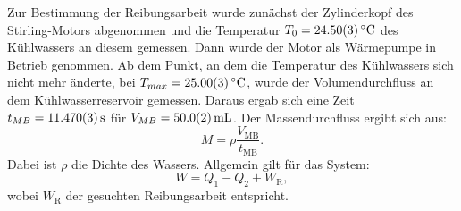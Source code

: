 	Zur Bestimmung der Reibungsarbeit wurde zunächst der Zylinderkopf des Stirling-Motors abgenommen und die Temperatur $T_0 = \SI{24,5+-0,03}{\celsius}$ des Kühlwassers an diesem gemessen.
	Dann  wurde der Motor als Wärmepumpe in Betrieb genommen.
	Ab dem Punkt, an dem die Temperatur des Kühlwassers sich nicht mehr änderte, bei $T_{max} = \SI{25,0+-0,03}{\celsius}$, wurde der Volumendurchfluss an dem Kühlwasserreservoir gemessen.
	Daraus ergab sich eine Zeit $t_{MB} = \SI{11,47+-0,003}{\second}$ für $V_{MB} = \SI{50+-0,2}{\milli\liter}$.
	Der Massendurchfluss ergibt sich aus:
	\begin{equation} %
		M = \rho \frac{V_\text{MB}}{t_\text{MB}}.
	\end{equation} %
	Dabei ist $\rho$ die Dichte des Wassers.
	Allgemein gilt für das System:
	\begin{equation} %
		W = Q_1 - Q_2 + W_\text{R},
	\end{equation} %
	wobei $W_\text{R}$ der gesuchten Reibungsarbeit entspricht.
	

